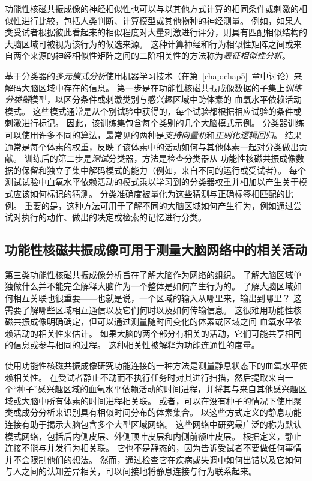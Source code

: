 功能性核磁共振成像的神经相似性也可以与以其他方式计算的相同条件或刺激的相似性进行比较，包括人类判断、计算模型或其他物种的神经测量。
例如，如果人类受试者根据彼此看起来的相似程度对大量刺激进行评分，则具有匹配相似结构的大脑区域可被视为该行为的候选来源。
这种计算神经和行为相似性矩阵之间或来自两个来源的神经相似性矩阵之间的二阶相关性的方法称为\textit{表征相似性分析}。


基于分类器的\textit{多元模式分析}使用机器学习技术（在第~\ref{chap:chap5}~章中讨论）来解码大脑区域中存在的信息。 
第一步是在功能性核磁共振成像数据的子集上\textit{训练分类器}模型，以区分条件或刺激类别与感兴趣区域中跨体素的 血氧水平依赖活动模式。
这些模式通常是从个别试验中获得的，每个试验都根据相应试验的条件或刺激进行标记。
因此，该训练集包含每个类别的几个大脑模式示例。
分类器训练可以使用许多不同的算法，最常见的两种是\textit{支持向量机}和\textit{正则化逻辑回归}。
结果通常是每个体素的权重，反映了该体素中的活动如何与其他体素一起对分类做出贡献。
训练后的第二步是\textit{测试}分类器，方法是检查分类器从 功能性核磁共振成像数据的保留和独立子集中解码模式的能力（例如，来自不同的运行或受试者）。
每个测试试验中血氧水平依赖活动的模式乘以学习到的分类器权重并相加以产生关于模式应该如何标记的猜测。
分类准确度被量化为这些猜测与正确标签相匹配的比例。
重要的是，这种方法可用于了解不同的大脑区域如何产生行为，例如通过尝试对执行的动作、做出的决定或检索的记忆进行分类。



\subsection{功能性核磁共振成像可用于测量大脑网络中的相关活动}

第三类功能性核磁共振成像分析旨在了解大脑作为网络的组织。
了解大脑区域单独做什么并不能完全解释大脑作为一个整体是如何产生行为的。
了解大脑区域如何相互关联也很重要——也就是说，一个区域的输入从哪里来，输出到哪里？
这需要了解哪些区域相互通信以及它们何时以及如何传输信息。
这很难用功能性核磁共振成像明确确定，但可以通过测量随时间变化的体素或区域之间 血氧水平依赖活动的相关性来估计。
如果大脑的两个部分有相关的活动，它们可能共享相同的信息或参与相同的过程。
这种相关性被解释为功能连通性的度量。


使用功能性核磁共振成像研究功能连接的一种方法是测量静息状态下的血氧水平依赖相关性。 
在受试者静止不动而不执行任务时对其进行扫描，然后提取来自一个“种子”感兴趣区域的血氧水平依赖活动的时间进程，并将其与来自其他感兴趣区域或大脑中所有体素的时间进程相关联。
或者，可以在没有种子的情况下使用聚类或成分分析来识别具有相似时间分布的体素集合。
以这些方式定义的静息功能连接有助于揭示大脑包含多个大型区域网络。
这些网络中研究最广泛的称为默认模式网络，包括后内侧皮层、外侧顶叶皮层和内侧前额叶皮层。
根据定义，静止连接不能与并发行为相关联。
它也不是静态的，因为告诉受试者不要做任何事情并不会限制他们的想法。
然而，通过检查它在疾病或失调中如何出错以及它如何与人之间的认知差异相关，可以间接地将静息连接与行为联系起来。


